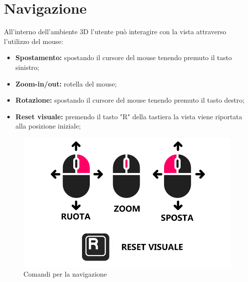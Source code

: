 \section{Navigazione}
All’interno dell'ambiente 3D l'utente può interagire con la vista attraverso l'utilizzo del mouse:
\begin{itemize}
    \item \textbf{Spostamento:} spostando il cursore del mouse tenendo premuto il tasto sinistro;
    \item \textbf{Zoom-in/out:} rotella del mouse;
    \item \textbf{Rotazione:} spostando il cursore del mouse tenendo premuto il tasto destro;
    \item \textbf{Reset visuale:} premendo il tasto "R" della tastiera la vista viene riportata alla posizione iniziale;
\end{itemize}
\clearpage
\begin{figure}[ht!]
    \centering
    \includegraphics[scale=0.6]{template/images/comandi.png}
    \caption{Comandi per la navigazione}
\end{figure}


